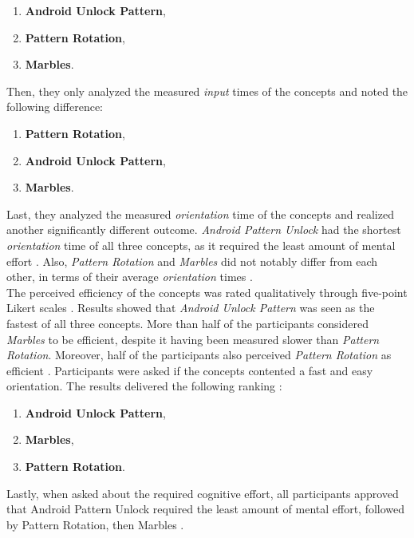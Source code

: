 \begin{enumerate}
    \item \textbf{Android Unlock Pattern},
    \item \textbf{Pattern Rotation},
    \item \textbf{Marbles}.
\end{enumerate} 

Then, they only analyzed the measured \textit{input} times of the concepts and  noted the following difference:

\begin{enumerate}
    \item \textbf{Pattern Rotation},
    \item \textbf{Android Unlock Pattern},
    \item \textbf{Marbles}.
\end{enumerate}

Last, they analyzed the measured \textit{orientation} time of the concepts and realized another significantly different outcome. \textit{Android Pattern Unlock} had the shortest \textit{orientation} time of all three concepts, as it required the least amount of mental effort   \cite{anonymous}. Also, \textit{Pattern Rotation} and \textit{Marbles} did not notably differ from each other, in terms of their average \textit{orientation} times \cite{anonymous}. \\


The perceived efficiency of the concepts was rated qualitatively through five-point Likert scales \cite{anonymous}. Results showed that \textit{Android Unlock Pattern} was seen as the fastest of all three concepts. More than half of the participants considered \textit{Marbles} to be efficient, despite it having been measured slower than \textit{Pattern Rotation}. Moreover, half of the participants also perceived \textit{Pattern Rotation} as efficient \cite{anonymous}. Participants were asked if the concepts contented a fast and easy orientation. The results delivered the following ranking \cite{anonymous}: 

\begin{enumerate}
     \item \textbf{Android Unlock Pattern},
    \item \textbf{Marbles},
    \item \textbf{Pattern Rotation}.
\end{enumerate}

Lastly, when asked about the required cognitive effort, all participants approved that Android Pattern Unlock required the least amount of mental effort, followed by Pattern Rotation, then Marbles \cite{anonymous}. \\

